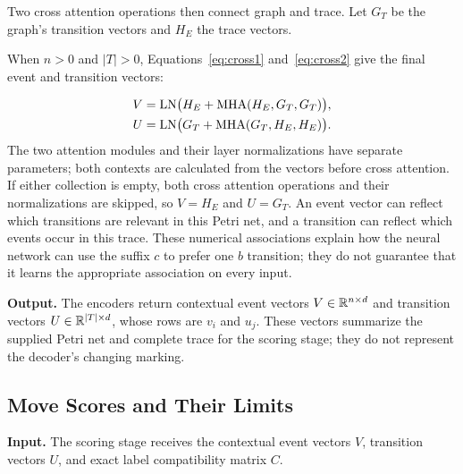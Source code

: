 Two cross attention operations then connect graph and trace. Let $G_T$ be the graph's transition vectors and $H_E$ the trace vectors. \begin{revised}When $n>0$ and $|T|>0$, Equations~\eqref{eq:cross1} and~\eqref{eq:cross2} give the final event and transition vectors:\end{revised}
\begin{align}
 V&=\operatorname{LN}\bigl(H_E+\operatorname{MHA}(H_E,G_T,G_T)\bigr),\label{eq:cross1}\\
 U&=\operatorname{LN}\bigl(G_T+\operatorname{MHA}(G_T,H_E,H_E)\bigr).\label{eq:cross2}
\end{align}
The two attention modules and their layer normalizations have separate parameters; both contexts are calculated from the vectors before cross attention. If either collection is empty, both cross attention operations and their normalizations are skipped, so $V=H_E$ and $U=G_T$. An event vector can reflect which transitions are relevant in this Petri net, and a transition can reflect which events occur in this trace. These numerical associations explain how the neural network can use the suffix $c$ to prefer one $b$ transition; they do not guarantee that it learns the appropriate association on every input.

\textbf{Output.} The encoders return contextual event vectors $V\in\mathbb{R}^{n\times d}$ and transition vectors $U\in\mathbb{R}^{|T|\times d}$, whose rows are $v_i$ and $u_j$. These vectors summarize the supplied Petri net and complete trace for the scoring stage; they do not represent the decoder's changing marking.

\subsection{Move Scores and Their Limits}
\label{sec:scores}

\textbf{Input.} The scoring stage receives the contextual event vectors $V$, transition vectors $U$, and exact label compatibility matrix $C$.

